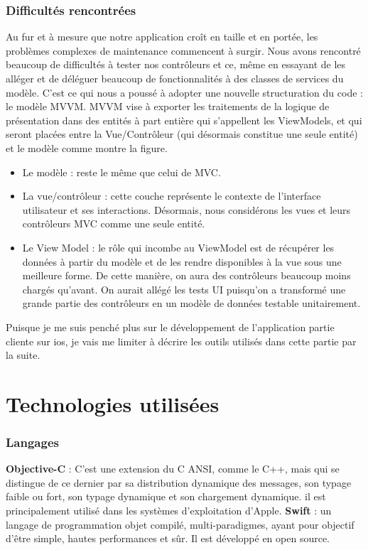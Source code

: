  \subsubsection{Difficultés rencontrées} %
 \label{ssub:difficultés_rencontrées_et_pourquoi_mvvm_}
 Au fur et à mesure que notre application croît en taille et en portée, les problèmes complexes de maintenance commencent à surgir. Nous avons rencontré beaucoup de difficultés à tester nos contrôleurs et ce, même en essayant de les alléger et de déléguer beaucoup de fonctionnalités à des classes de services du modèle. C'est ce qui nous a poussé à adopter une nouvelle structuration du code : le modèle MVVM.\cite{mvvm}\newline
 MVVM vise à exporter les traitements de la logique de présentation dans des entités à part entière qui s'appellent les ViewModels, et qui seront placées entre la Vue/Contrôleur (qui désormais constitue une seule entité) et le modèle comme montre la figure.
 \begin{itemize}
 	\item Le modèle : reste le même que celui de MVC.
 	\item La vue/contrôleur : cette couche représente le contexte de l'interface utilisateur et ses interactions. Désormais, nous considérons les vues et leurs contrôleurs MVC comme une seule entité.
 	\item Le View Model : le rôle qui incombe au ViewModel est de récupérer les données à partir du modèle et de les rendre disponibles à la vue sous une meilleure forme. De cette manière, on aura des contrôleurs beaucoup moins chargés qu'avant. On aurait allégé les tests UI puisqu'on a transformé une grande partie des contrôleurs en un modèle de données testable unitairement.
 \end{itemize}
 Puisque je me suis penché plus sur le développement de l'application partie cliente sur ios, je vais me limiter à décrire les outils utilisés dans cette partie par la suite.

\section{Technologies utilisées} %
\label{sec:technologies_et_outils_utilisés}
\subsubsection{Langages} %
\label{ssub:lanages}
\begin{itemize}
	\itemb \textbf{Objective-C} : C'est une extension du C ANSI, comme le C++, mais qui se distingue de ce dernier par sa distribution dynamique des messages, son typage faible ou fort, son typage dynamique et son chargement dynamique. il est principalement utilisé dans les systèmes d'exploitation d'Apple.
	\itemb \textbf{Swift} : un langage de programmation objet compilé, multi-paradigmes, ayant pour objectif d'être simple, hautes performances et sûr. Il est développé en open source.
\end{itemize}

